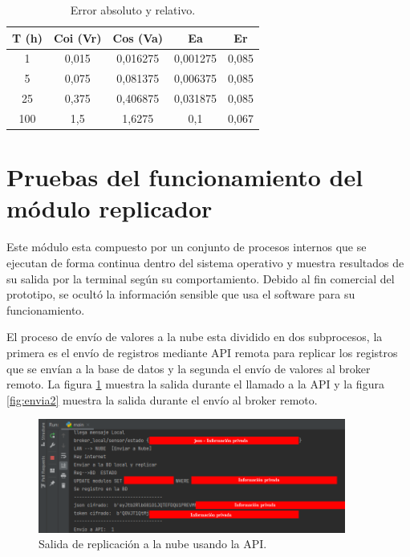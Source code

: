 \vspace{0.5cm}
\begin{table}[h]
	\centering
	\caption[Error absoluto y relativo]{Error absoluto y relativo.}
	\begin{tabular}{c c c c c}    
		\toprule
		\textbf{T (h)} & \textbf{Coi (Vr)} &\textbf{Cos (Va)} &\textbf{Ea} &\textbf{Er}\\
		\midrule
		1 & 0,015 & 0,016275 & 0,001275 & 0,085 \\		
		5 & 0,075 & 0,081375 & 0,006375 & 0,085 \\
		25 & 0,375 & 0,406875 & 0,031875 & 0,085\\		
		100 & 1,5 & 1,6275 & 0,1 & 0,067\\		
		
		\bottomrule
		\hline
	\end{tabular}
	\label{tab:tablaerror}
\end{table}

\section{Pruebas del funcionamiento del módulo replicador}

Este módulo esta compuesto por un conjunto de procesos internos que se ejecutan de forma continua dentro del sistema operativo y muestra resultados de su salida por la terminal según su comportamiento. Debido al fin comercial del prototipo, se ocultó la información sensible que usa el software para su funcionamiento.

El proceso de envío de valores a la nube esta dividido en dos subprocesos, la primera es el envío de registros mediante API remota para replicar los registros que se envían a la base de datos y la segunda el envío de valores al broker remoto. La figura \ref{fig:envia1} muestra la salida durante el llamado a la API y la figura \ref{fig:envia2} muestra la salida durante el envío al broker remoto.

\begin{figure}[htpb]
\centering 
\includegraphics[width=0.9\textwidth]{./Figures/test/replicador/enviaAPI.png}
\caption{Salida de replicación a la nube usando la API.}
\label{fig:envia1}
\end{figure}

